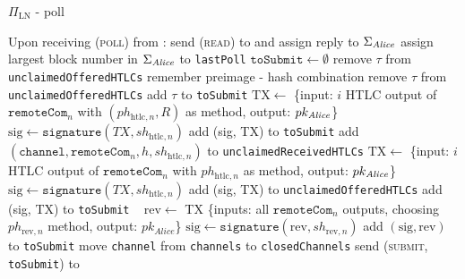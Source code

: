 \begin{protocolbox}{$\Pi_{\mathrm{LN}}$ - poll}
  \label{alg:protocol:poll}
  \begin{algorithmic}[1]
    \State Upon receiving (\textsc{poll}) from \environment:
    \Indent
      \State send (\textsc{read}) to \ledger{} and assign reply to
      $\Sigma_{\mathit{Alice}}$
      \State assign largest block number in $\Sigma_{\mathit{Alice}}$ to
      \texttt{lastPoll}
    \State $\mathtt{toSubmit} \gets \emptyset$
         
          \State remove $\tau$ from \texttt{unclaimedOfferedHTLCs}
          \State remember preimage - hash combination
          \State remove $\tau$ from \texttt{unclaimedOfferedHTLCs}
          \State add $\tau$ to \texttt{toSubmit}
        \EndIf
      \EndFor
         
              \State $\mathrm{TX} \gets$ \{input: $i$ HTLC output of
              $\mathtt{remoteCom}_n$ with $\left(ph_{\mathrm{htlc}, n},
              R\right)$ as method, output: $pk_{\mathit{Alice}}$\}
              \State $\mathrm{sig} \gets \mathtt{signature}\left(TX,
              sh_{\mathrm{htlc}, n}\right)$
              \State add (sig, TX) to \texttt{toSubmit}
            \Else
              \State add $\left(\texttt{channel}, \mathtt{remoteCom}_n, h,
              sh_{\mathrm{htlc}, n}\right)$ to \texttt{unclaimedReceivedHTLCs}
            \EndIf
          \EndFor
            \State $\mathrm{TX} \gets$ \{input: $i$ HTLC output of
            $\mathtt{remoteCom}_n$ with $ph_{\mathrm{htlc}, n}$ as method,
            output: $pk_{\mathit{Alice}}$\}
            \State $\mathrm{sig} \gets \mathtt{signature}\left(TX,
            sh_{\mathrm{htlc}, n}\right)$
              \State add (sig, TX) to \texttt{unclaimedOfferedHTLCs}
              \State add (sig, TX) to \texttt{toSubmit}
            \EndIf
          \EndFor
        \Else \ 
          \State $\mathrm{rev} \gets$ TX \{inputs: all $\mathtt{remoteCom}_n$
          outputs, choosing $ph_{\mathrm{rev}, n}$ method, output:
          $pk_{\mathit{Alice}}$\}
          \State $\mathrm{sig} \gets \mathtt{signature}\left(\mathrm{rev},
          sh_{\mathrm{rev}, n}\right)$
          \State add $\left(\mathrm{sig}, \mathrm{rev}\right)$ to
          \texttt{toSubmit}
        \EndIf
        \State move \texttt{channel} from \texttt{channels} to
        \texttt{closedChannels}
      \EndFor
      \State send (\textsc{submit}, \texttt{toSubmit}) to \ledger
    \EndIndent
    \State


\end{algorithmic}
\end{protocolbox}
